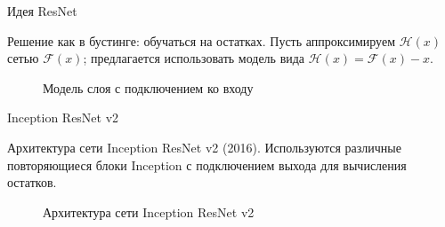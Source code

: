 \documentclass[11pt, intlimits]{beamer}
\begin{document}
\begin{frame}{Идея ResNet}

Решение как в бустинге: обучаться на остатках. Пусть аппроксимируем $\mathcal{H}(x)$ сетью $\mathcal{F}(x)$; предлагается использовать модель вида $\mathcal{H}(x)=\mathcal{F}(x)-x$.

\begin{figure}[h]
\caption{Модель слоя с подключением ко входу}
\label{img:resnet}
\end{figure}

\end{frame}

\begin{frame}{Inception ResNet v2}

Архитектура сети Inception ResNet v2 (2016). Используются различные повторяющиеся блоки Inception с подключением выхода для вычисления остатков.

\begin{figure}[h]
\caption{Архитектура сети Inception ResNet v2}
\label{img:IncResNet_v2}
\end{figure}

\end{frame}
\end{document}
